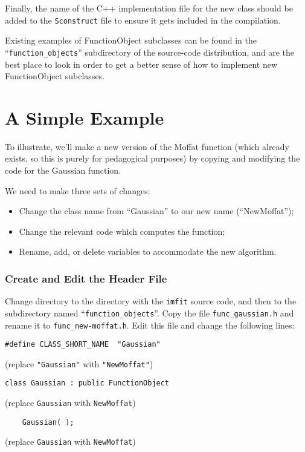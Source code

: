 \documentclass[10pt,a4paper,article]{memoir}
\newcommand{\imfit}{\texttt{imfit}}
\begin{document}
Finally, the name of the C++ implementation file for the new class should be added
to the \texttt{Sconstruct} file to ensure it gets included in the compilation.

Existing examples of FunctionObject subclasses can be found in the ``\texttt{function\_objects}''
subdirectory of the source-code distribution, and are the best place to look in order
to get a better sense of how to implement new FunctionObject subclasses.


\section{A Simple Example}

To illustrate, we'll make a new version of the Moffat function (which already
exists, so this is purely for pedagogical purposes) by copying and modifying the
code for the Gaussian function.

\bigskip

We need to make three sets of changes:
\begin{itemize}
\item Change the class name from ``Gaussian'' to our new name (``NewMoffat'');
\item Change the relevant code which computes the function;
\item Rename, add, or delete variables to accommodate the new algorithm.
\end{itemize}


\subsubsection{Create and Edit the Header File}

Change directory to the directory with the \imfit{} source code, and then
to the subdirectory named ``\texttt{function\_objects}''. Copy the file
\texttt{func\_gaussian.h} and rename it to \texttt{func\_new-moffat.h}. Edit
this file and change the following lines:

\begin{verbatim}
#define CLASS_SHORT_NAME  "Gaussian"
\end{verbatim} 
(replace \texttt{"Gaussian"} with \texttt{"NewMoffat"})

\begin{verbatim}
class Gaussian : public FunctionObject
\end{verbatim}
(replace \texttt{Gaussian} with \texttt{NewMoffat})

\begin{verbatim}
    Gaussian( );
\end{verbatim}
(replace \texttt{Gaussian} with \texttt{NewMoffat})
\end{document}
